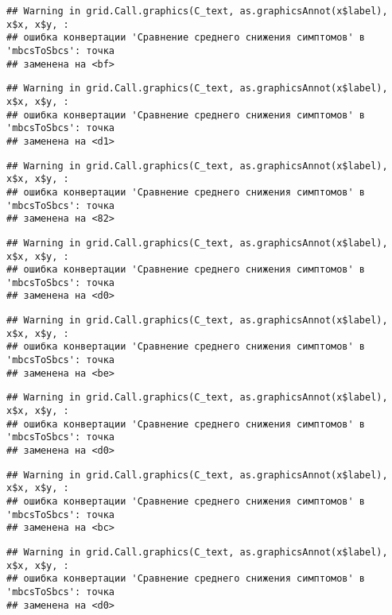 \documentclass[
]{article}
\begin{document}
\begin{verbatim}
## Warning in grid.Call.graphics(C_text, as.graphicsAnnot(x$label), x$x, x$y, :
## ошибка конвертации 'Сравнение среднего снижения симптомов' в 'mbcsToSbcs': точка
## заменена на <bf>
\end{verbatim}

\begin{verbatim}
## Warning in grid.Call.graphics(C_text, as.graphicsAnnot(x$label), x$x, x$y, :
## ошибка конвертации 'Сравнение среднего снижения симптомов' в 'mbcsToSbcs': точка
## заменена на <d1>
\end{verbatim}

\begin{verbatim}
## Warning in grid.Call.graphics(C_text, as.graphicsAnnot(x$label), x$x, x$y, :
## ошибка конвертации 'Сравнение среднего снижения симптомов' в 'mbcsToSbcs': точка
## заменена на <82>
\end{verbatim}

\begin{verbatim}
## Warning in grid.Call.graphics(C_text, as.graphicsAnnot(x$label), x$x, x$y, :
## ошибка конвертации 'Сравнение среднего снижения симптомов' в 'mbcsToSbcs': точка
## заменена на <d0>
\end{verbatim}

\begin{verbatim}
## Warning in grid.Call.graphics(C_text, as.graphicsAnnot(x$label), x$x, x$y, :
## ошибка конвертации 'Сравнение среднего снижения симптомов' в 'mbcsToSbcs': точка
## заменена на <be>
\end{verbatim}

\begin{verbatim}
## Warning in grid.Call.graphics(C_text, as.graphicsAnnot(x$label), x$x, x$y, :
## ошибка конвертации 'Сравнение среднего снижения симптомов' в 'mbcsToSbcs': точка
## заменена на <d0>
\end{verbatim}

\begin{verbatim}
## Warning in grid.Call.graphics(C_text, as.graphicsAnnot(x$label), x$x, x$y, :
## ошибка конвертации 'Сравнение среднего снижения симптомов' в 'mbcsToSbcs': точка
## заменена на <bc>
\end{verbatim}

\begin{verbatim}
## Warning in grid.Call.graphics(C_text, as.graphicsAnnot(x$label), x$x, x$y, :
## ошибка конвертации 'Сравнение среднего снижения симптомов' в 'mbcsToSbcs': точка
## заменена на <d0>
\end{verbatim}
\end{document}
